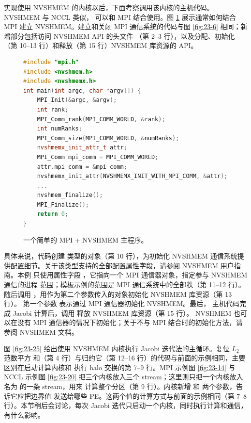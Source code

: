实现使用 NVSHMEM 的内核以后，下面考察调用该内核的主机代码。NVSHMEM 与 NCCL 类似，
可以和 MPI 结合使用。图 \ref{fig:23-24} 展示通常如何结合 MPI 建立 NVSHMEM。建立和关闭
MPI 通信系统的代码与图 \ref{fig:23-6} 相同；新增部分包括访问 NVSHMEM API 的头文件
（第 2--3 行），以及分配、初始化（第 10--13 行）和释放（第 15 行）NVSHMEM 库资源的 API。

\begin{figure}[htbp]
  \centering
  \begin{lstlisting}[language=C++,basicstyle=\ttfamily\scriptsize,firstnumber=1]
#include "mpi.h"
#include <nvshmem.h>
#include <nvshmemx.h>
int main(int argc, char *argv[]) {
    MPI_Init(&argc, &argv);
    int rank;
    MPI_Comm_rank(MPI_COMM_WORLD, &rank);
    int numRanks;
    MPI_Comm_size(MPI_COMM_WORLD, &numRanks);
    nvshmemx_init_attr_t attr;
    MPI_Comm mpi_comm = MPI_COMM_WORLD;
    attr.mpi_comm = &mpi_comm;
    nvshmemx_init_attr(NVSHMEMX_INIT_WITH_MPI_COMM, &attr);
    ...
    nvshmem_finalize();
    MPI_Finalize();
    return 0;
}
  \end{lstlisting}
  \caption{一个简单的 MPI + NVSHMEM 主程序。}
  \label{fig:23-24}
\end{figure}

具体来说，代码创建  类型的对象（第 10 行），为初始化 NVSHMEM
通信系统提供配置细节。关于该类型支持的全部配置属性字段，请参阅 NVSHMEM 用户指南。本例
只使用属性字段 ，它指向一个 MPI 通信器对象，指定参与 NVSHMEM 通信的进程
范围；模板示例的范围是 MPI 通信系统中的全部秩（第 11--12 行）。随后调用
，用作为第二个参数传入的对象初始化 NVSHMEM 库资源（第 13 行）。
第一个参数  表示通过 MPI 通信器初始化 NVSHMEM。最后，
主机代码完成 Jacobi 计算后，调用  释放 NVSHMEM 库资源（第 15 行）。
NVSHMEM 也可以在没有 MPI 通信器的情况下初始化；关于不与 MPI 结合时的初始化方法，请参阅
NVSHMEM 文档\cite{ch23-nvshmem}。

图 \ref{fig:23-25} 给出使用 NVSHMEM 内核执行 Jacobi 迭代法的主循环。复位 $L_2$ 范数平方
和（第 4 行）与归约它（第 12--16 行）的代码与前面的示例相同，主要区别在启动计算内核和
执行 halo 交换的第 7--9 行。MPI 示例图 \ref{fig:23-14} 与 NCCL 示例图 \ref{fig:23-20}
把三个内核放入三个 stream；这里则只把一个内核放入名为  的一条 stream，用来
计算整个分区（第 9 行）。内核新增  和  两个参数，告诉它应把边界值
发送给哪些 PE。这两个值的计算方式与前面的示例相同（第 7--8 行）。本节稍后会讨论，每次
Jacobi 迭代只启动一个内核，同时执行计算和通信，有什么影响。

